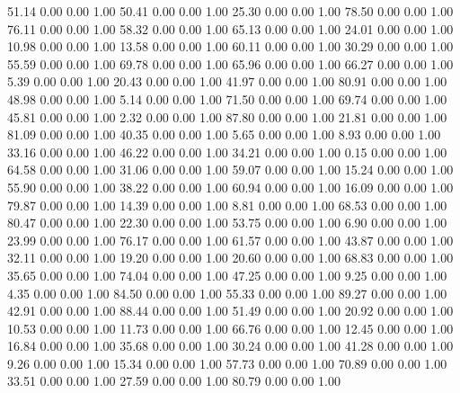    51.14   0.00   0.00   1.00
   50.41   0.00   0.00   1.00
   25.30   0.00   0.00   1.00
   78.50   0.00   0.00   1.00
   76.11   0.00   0.00   1.00
   58.32   0.00   0.00   1.00
   65.13   0.00   0.00   1.00
   24.01   0.00   0.00   1.00
   10.98   0.00   0.00   1.00
   13.58   0.00   0.00   1.00
   60.11   0.00   0.00   1.00
   30.29   0.00   0.00   1.00
   55.59   0.00   0.00   1.00
   69.78   0.00   0.00   1.00
   65.96   0.00   0.00   1.00
   66.27   0.00   0.00   1.00
    5.39   0.00   0.00   1.00
   20.43   0.00   0.00   1.00
   41.97   0.00   0.00   1.00
   80.91   0.00   0.00   1.00
   48.98   0.00   0.00   1.00
    5.14   0.00   0.00   1.00
   71.50   0.00   0.00   1.00
   69.74   0.00   0.00   1.00
   45.81   0.00   0.00   1.00
    2.32   0.00   0.00   1.00
   87.80   0.00   0.00   1.00
   21.81   0.00   0.00   1.00
   81.09   0.00   0.00   1.00
   40.35   0.00   0.00   1.00
    5.65   0.00   0.00   1.00
    8.93   0.00   0.00   1.00
   33.16   0.00   0.00   1.00
   46.22   0.00   0.00   1.00
   34.21   0.00   0.00   1.00
    0.15   0.00   0.00   1.00
   64.58   0.00   0.00   1.00
   31.06   0.00   0.00   1.00
   59.07   0.00   0.00   1.00
   15.24   0.00   0.00   1.00
   55.90   0.00   0.00   1.00
   38.22   0.00   0.00   1.00
   60.94   0.00   0.00   1.00
   16.09   0.00   0.00   1.00
   79.87   0.00   0.00   1.00
   14.39   0.00   0.00   1.00
    8.81   0.00   0.00   1.00
   68.53   0.00   0.00   1.00
   80.47   0.00   0.00   1.00
   22.30   0.00   0.00   1.00
   53.75   0.00   0.00   1.00
    6.90   0.00   0.00   1.00
   23.99   0.00   0.00   1.00
   76.17   0.00   0.00   1.00
   61.57   0.00   0.00   1.00
   43.87   0.00   0.00   1.00
   32.11   0.00   0.00   1.00
   19.20   0.00   0.00   1.00
   20.60   0.00   0.00   1.00
   68.83   0.00   0.00   1.00
   35.65   0.00   0.00   1.00
   74.04   0.00   0.00   1.00
   47.25   0.00   0.00   1.00
    9.25   0.00   0.00   1.00
    4.35   0.00   0.00   1.00
   84.50   0.00   0.00   1.00
   55.33   0.00   0.00   1.00
   89.27   0.00   0.00   1.00
   42.91   0.00   0.00   1.00
   88.44   0.00   0.00   1.00
   51.49   0.00   0.00   1.00
   20.92   0.00   0.00   1.00
   10.53   0.00   0.00   1.00
   11.73   0.00   0.00   1.00
   66.76   0.00   0.00   1.00
   12.45   0.00   0.00   1.00
   16.84   0.00   0.00   1.00
   35.68   0.00   0.00   1.00
   30.24   0.00   0.00   1.00
   41.28   0.00   0.00   1.00
    9.26   0.00   0.00   1.00
   15.34   0.00   0.00   1.00
   57.73   0.00   0.00   1.00
   70.89   0.00   0.00   1.00
   33.51   0.00   0.00   1.00
   27.59   0.00   0.00   1.00
   80.79   0.00   0.00   1.00
